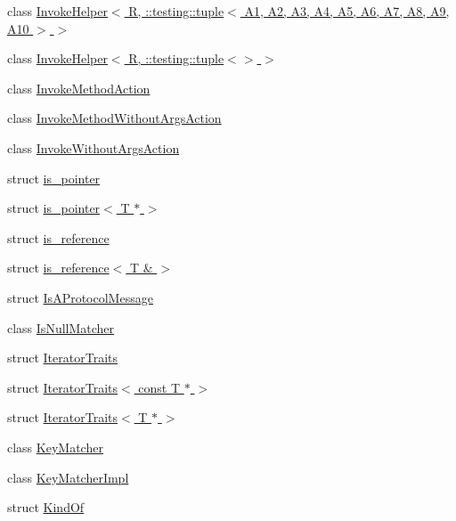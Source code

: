 \begin{DoxyCompactItemize}
\item 
class \hyperlink{classtesting_1_1internal_1_1InvokeHelper_3_01R_00_01_1_1testing_1_1tuple_3_01A1_00_01A2_00_01A3_9a04af5e172e051ec3c8faaa2f50b42f}{Invoke\+Helper$<$ R, \+::testing\+::tuple$<$ A1, A2, A3, A4, A5, A6, A7, A8, A9, A10 $>$ $>$}
\item 
class \hyperlink{classtesting_1_1internal_1_1InvokeHelper_3_01R_00_01_1_1testing_1_1tuple_3_4_01_4}{Invoke\+Helper$<$ R, \+::testing\+::tuple$<$$>$ $>$}
\item 
class \hyperlink{classtesting_1_1internal_1_1InvokeMethodAction}{Invoke\+Method\+Action}
\item 
class \hyperlink{classtesting_1_1internal_1_1InvokeMethodWithoutArgsAction}{Invoke\+Method\+Without\+Args\+Action}
\item 
class \hyperlink{classtesting_1_1internal_1_1InvokeWithoutArgsAction}{Invoke\+Without\+Args\+Action}
\item 
struct \hyperlink{structtesting_1_1internal_1_1is__pointer}{is\+\_\+pointer}
\item 
struct \hyperlink{structtesting_1_1internal_1_1is__pointer_3_01T_01_5_01_4}{is\+\_\+pointer$<$ T $\ast$ $>$}
\item 
struct \hyperlink{structtesting_1_1internal_1_1is__reference}{is\+\_\+reference}
\item 
struct \hyperlink{structtesting_1_1internal_1_1is__reference_3_01T_01_6_01_4}{is\+\_\+reference$<$ T \& $>$}
\item 
struct \hyperlink{structtesting_1_1internal_1_1IsAProtocolMessage}{Is\+A\+Protocol\+Message}
\item 
class \hyperlink{classtesting_1_1internal_1_1IsNullMatcher}{Is\+Null\+Matcher}
\item 
struct \hyperlink{structtesting_1_1internal_1_1IteratorTraits}{Iterator\+Traits}
\item 
struct \hyperlink{structtesting_1_1internal_1_1IteratorTraits_3_01const_01T_01_5_01_4}{Iterator\+Traits$<$ const T $\ast$ $>$}
\item 
struct \hyperlink{structtesting_1_1internal_1_1IteratorTraits_3_01T_01_5_01_4}{Iterator\+Traits$<$ T $\ast$ $>$}
\item 
class \hyperlink{classtesting_1_1internal_1_1KeyMatcher}{Key\+Matcher}
\item 
class \hyperlink{classtesting_1_1internal_1_1KeyMatcherImpl}{Key\+Matcher\+Impl}
\item 
struct \hyperlink{structtesting_1_1internal_1_1KindOf}{Kind\+Of}
\item 

\end{DoxyCompactItemize}
